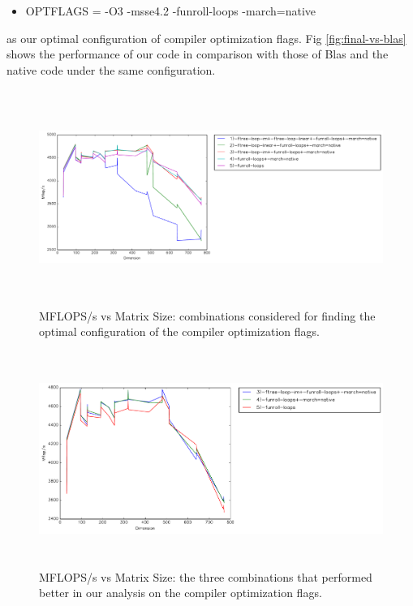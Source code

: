 \documentclass{article}
\begin{document}
\begin{itemize}

\item OPTFLAGS = -O3 -msse4.2 -funroll-loops -march=native

\end{itemize}
%
as our optimal configuration of compiler optimization flags. Fig \ref{fig:final-vs-blas} shows the performance of our code in comparison with those of Blas and the native code under the same configuration.
 
  \begin{figure}[h]
    \centering
    \includegraphics[width=16cm,height=7cm]{timing-final-config.pdf}
    \caption{MFLOPS/s vs Matrix Size: combinations considered for finding the optimal configuration of the compiler optimization flags.}
    \label{fig:combo-analysis1}
  \end{figure}

  \begin{figure}[h]
    \centering
    \includegraphics[width=16cm,height=7cm]{timing-final-config-clear.pdf}
    \caption{MFLOPS/s vs Matrix Size: the three combinations that performed better in our analysis on the compiler optimization flags.}
    \label{fig:combo-analysis2}
  \end{figure}
  
\end{document}
